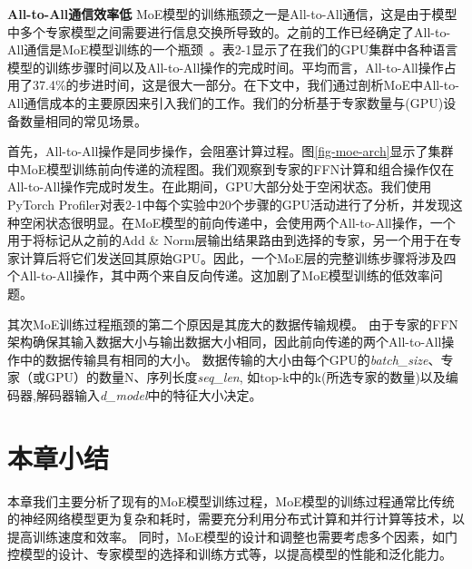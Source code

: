 \noindent \textbf{All-to-All通信效率低}
MoE模型的训练瓶颈之一是All-to-All通信，这是由于模型中多个专家模型之间需要进行信息交换所导致的。之前的工作已经确定了All-to-All通信是MoE模型训练的一个瓶颈~。表2-1显示了在我们的GPU集群中各种语言模型的训练步骤时间以及All-to-All操作的完成时间。平均而言，All-to-All操作占用了37.4\%的步进时间，这是很大一部分。在下文中，我们通过剖析MoE中All-to-All通信成本的主要原因来引入我们的工作。我们的分析基于专家数量与(GPU)设备数量相同的常见场景。

首先，All-to-All操作是同步操作，会阻塞计算过程。图\ref{fig-moe-arch}显示了集群中MoE模型训练前向传递的流程图。我们观察到专家的FFN计算和组合操作仅在All-to-All操作完成时发生。在此期间，GPU大部分处于空闲状态。我们使用PyTorch Profiler对表2-1中每个实验中20个步骤的GPU活动进行了分析，并发现这种空闲状态很明显。在MoE模型的前向传递中，会使用两个All-to-All操作，一个用于将标记从之前的Add \& Norm层输出结果路由到选择的专家，另一个用于在专家计算后将它们发送回其原始GPU。因此，一个MoE层的完整训练步骤将涉及四个All-to-All操作，其中两个来自反向传递。这加剧了MoE模型训练的低效率问题。

其次MoE训练过程瓶颈的第二个原因是其庞大的数据传输规模。
由于专家的FFN架构确保其输入数据大小与输出数据大小相同，因此前向传递的两个All-to-All操作中的数据传输具有相同的大小。
数据传输的大小由每个GPU的\textit{batch\_size}、专家（或GPU）的数量N、序列长度\textit{seq\_len}, 如top-k中的k(所选专家的数量)以及编码器,解码器输入\textit{d\_model}中的特征大小决定。

\section{本章小结}

本章我们主要分析了现有的MoE模型训练过程，MoE模型的训练过程通常比传统的神经网络模型更为复杂和耗时，需要充分利用分布式计算和并行计算等技术，以提高训练速度和效率。
% 
同时，MoE模型的设计和调整也需要考虑多个因素，如门控模型的设计、专家模型的选择和训练方式等，以提高模型的性能和泛化能力。

\endinput
